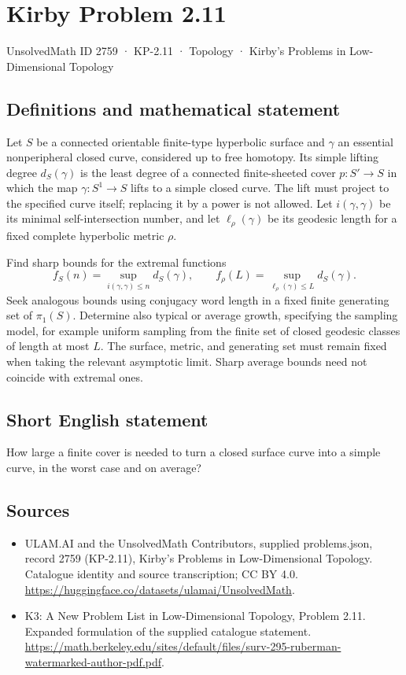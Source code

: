 \documentclass[11pt,a4paper]{article}
\begin{document}
\section*{Kirby Problem 2.11}\label{2759}
{\small UnsolvedMath ID 2759 · KP-2.11 · Topology · Kirby's Problems in Low-Dimensional Topology}
\subsection{Definitions and mathematical statement}
Let $S$ be a connected orientable finite-type hyperbolic surface and $\gamma$ an
essential nonperipheral closed curve, considered up to free homotopy.
Its simple lifting degree $d_S(\gamma)$ is the least degree of a connected
finite-sheeted cover $p:S'\to S$ in which the map $\gamma:S^1\to S$ lifts to
a simple closed curve. The lift must project to the specified curve itself;
replacing it by a power is not allowed.
Let $i(\gamma,\gamma)$ be its minimal self-intersection number, and let
$\ell_\rho(\gamma)$ be its geodesic length for a fixed complete hyperbolic
metric $\rho$.

Find sharp bounds for the extremal functions
\[
f_S(n)=\sup_{i(\gamma,\gamma)\leq n}d_S(\gamma),\qquad
f_\rho(L)=\sup_{\ell_\rho(\gamma)\leq L}d_S(\gamma).
\]
Seek analogous bounds using conjugacy word length in a fixed finite generating
set of $\pi_1(S)$. Determine also typical or average growth, specifying the
sampling model, for example uniform sampling from the finite set of closed
geodesic classes of length at most $L$. The surface, metric, and generating
set must remain fixed when taking the relevant asymptotic limit. Sharp average
bounds need not coincide with extremal ones.
\subsection{Short English statement}
How large a finite cover is needed to turn a closed surface curve into a simple curve, in the worst case and on average?
\subsection{Sources}
\begin{itemize}
\item[S1] ULAM.AI and the UnsolvedMath Contributors, supplied problems.json, record 2759 (KP-2.11), Kirby's Problems in Low-Dimensional Topology. Catalogue identity and source transcription; CC BY 4.0.
\url{https://huggingface.co/datasets/ulamai/UnsolvedMath}.
\item[S2] K3: A New Problem List in Low-Dimensional Topology, Problem 2.11. Expanded formulation of the supplied catalogue statement.
\url{https://math.berkeley.edu/sites/default/files/surv-295-ruberman-watermarked-author-pdf.pdf}.
\end{itemize}
\end{document}

